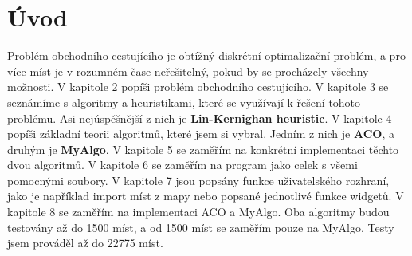 
%
\chapter{Úvod}
Problém obchodního cestujícího je obtížný diskrétní optimalizační problém, a pro více míst je v rozumném čase neřešitelný, pokud by se procházely všechny možnosti. V kapitole 2 popíši problém obchodního cestujícího. V kapitole 3 se seznámíme s algoritmy a heuristikami, které se využívají k řešení tohoto problému. Asi nejúspěšnější z nich je \textbf{Lin-Kernighan heuristic}. V kapitole 4 popíši základní teorii algoritmů, které jsem si vybral. Jedním z nich je \textbf{ACO}, a druhým je \textbf{MyAlgo}. V kapitole 5 se zaměřím na konkrétní implementaci těchto dvou algoritmů. V kapitole 6 se zaměřím na program jako celek s všemi pomocnými soubory. V kapitole 7 jsou popsány funkce uživatelského rozhraní, jako je například import míst z mapy nebo popsané jednotlivé funkce widgetů. V kapitole 8 se zaměřím na implementaci ACO a MyAlgo. Oba algoritmy budou testovány až do 1500 míst, a od 1500 míst se zaměřím pouze na MyAlgo. Testy jsem prováděl až do 22775 míst.





